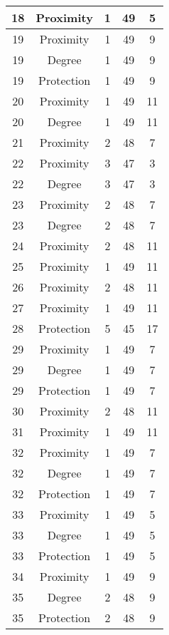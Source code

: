 \documentclass[results.tex]{subfiles}
\begin{document}
\begin{center}
\begin{tabular}{| c || c | c | c | c |}
    \hline
    18 & Proximity & 1 & 49 & 5 \\ 
    \hline
    19 & Proximity & 1 & 49 & 9 \\ 
    \hline
    19 & Degree & 1 & 49 & 9 \\ 
    \hline
    19 & Protection & 1 & 49 & 9 \\ 
    \hline
    20 & Proximity & 1 & 49 & 11 \\ 
    \hline
    20 & Degree & 1 & 49 & 11 \\ 
    \hline
    21 & Proximity & 2 & 48 & 7 \\ 
    \hline
    22 & Proximity & 3 & 47 & 3 \\ 
    \hline
    22 & Degree & 3 & 47 & 3 \\ 
    \hline
    23 & Proximity & 2 & 48 & 7 \\ 
    \hline
    23 & Degree & 2 & 48 & 7 \\ 
    \hline
    24 & Proximity & 2 & 48 & 11 \\ 
    \hline
    25 & Proximity & 1 & 49 & 11 \\ 
    \hline
    26 & Proximity & 2 & 48 & 11 \\ 
    \hline
    27 & Proximity & 1 & 49 & 11 \\ 
    \hline
    28 & Protection & 5 & 45 & 17 \\ 
    \hline
    29 & Proximity & 1 & 49 & 7 \\ 
    \hline
    29 & Degree & 1 & 49 & 7 \\ 
    \hline
    29 & Protection & 1 & 49 & 7 \\ 
    \hline
    30 & Proximity & 2 & 48 & 11 \\ 
    \hline
    31 & Proximity & 1 & 49 & 11 \\ 
    \hline
    32 & Proximity & 1 & 49 & 7 \\ 
    \hline
    32 & Degree & 1 & 49 & 7 \\ 
    \hline
    32 & Protection & 1 & 49 & 7 \\ 
    \hline
    33 & Proximity & 1 & 49 & 5 \\ 
    \hline
    33 & Degree & 1 & 49 & 5 \\ 
    \hline
    33 & Protection & 1 & 49 & 5 \\ 
    \hline
    34 & Proximity & 1 & 49 & 9 \\ 
    \hline
    35 & Degree & 2 & 48 & 9 \\ 
    \hline
    35 & Protection & 2 & 48 & 9 \\ 

\end{tabular}
\end{center}
\end{document}
